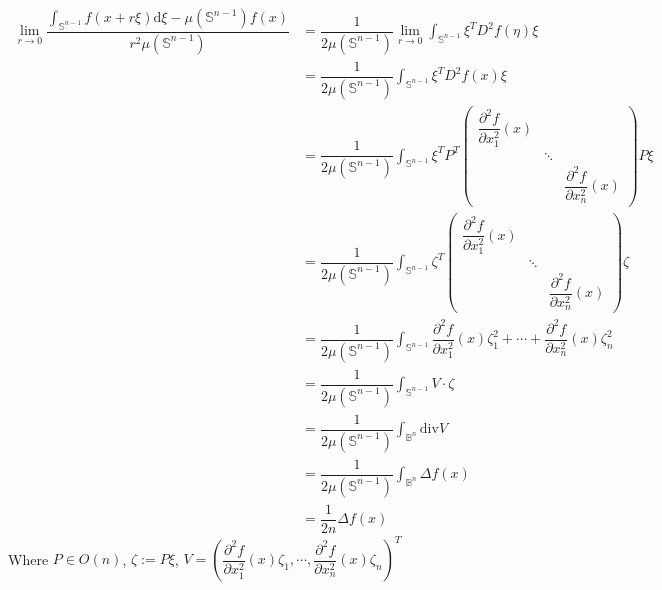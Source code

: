 \documentclass{article}
\begin{document}
\[
\begin{aligned}
\lim_{r\rightarrow 0}\dfrac{\int_{\mathbb{S}^{n-1}}f(x+r\xi)\mathrm{d}\xi-\mu(\mathbb{S}^{n-1})f(x)}{r^{2}\mu(\mathbb{S}^{n-1})} 
&=\dfrac{1}{2\mu(\mathbb{S}^{n-1})}\lim_{r\rightarrow 0}\int_{\mathbb{S}^{n-1}}\xi^{T}D^{2}f(\eta)\xi \\
&=\dfrac{1}{2\mu(\mathbb{S}^{n-1})}\int_{\mathbb{S}^{n-1}}\xi^{T}D^{2}f(x)\xi \\
&=\dfrac{1}{2\mu(\mathbb{S}^{n-1})}\int_{\mathbb{S}^{n-1}}\xi^{T}P^{T}
\begin{pmatrix}
\dfrac{\partial^{2}f}{\partial x_{1}^{2}}(x) &  & \\ 
 & \ddots  & \\ 
 &  & \dfrac{\partial^{2}f}{\partial x_{n}^{2}}(x)
\end{pmatrix}
P\xi \\
&=\dfrac{1}{2\mu(\mathbb{S}^{n-1})}\int_{\mathbb{S}^{n-1}}\zeta^{T}
\begin{pmatrix}
\dfrac{\partial^{2}f}{\partial x_{1}^{2}}(x) &  & \\ 
 & \ddots  & \\ 
 &  & \dfrac{\partial^{2}f}{\partial x_{n}^{2}}(x)
\end{pmatrix}
\zeta \\
&=\dfrac{1}{2\mu(\mathbb{S}^{n-1})}\int_{\mathbb{S}^{n-1}}\dfrac{\partial^{2}f}{\partial x_{1}^{2}}(x)\zeta_{1}^{2}+\cdots+\dfrac{\partial^{2}f}{\partial x_{n}^{2}}(x)\zeta_{n}^{2} \\
&= \dfrac{1}{2\mu(\mathbb{S}^{n-1})}\int_{\mathbb{S}^{n-1}}V \cdot \zeta \\
&= \dfrac{1}{2\mu(\mathbb{S}^{n-1})}\int_{\mathbb{B}^{n}}\mathrm{div}V \\
&= \dfrac{1}{2\mu(\mathbb{S}^{n-1})}\int_{\mathbb{B}^{n}}\Delta f(x) \\
&= \dfrac{1}{2n}\Delta f(x)
\end{aligned}
\]
Where \(P\in O(n)\), \(\zeta:=P\xi\), \(V=\left(\dfrac{\partial^{2}f}{\partial x_{1}^{2}}(x)\zeta_{1}, \cdots, \dfrac{\partial^{2}f}{\partial x_{n}^{2}}(x)\zeta_{n}\right)^{T}\) 
\end{document}
